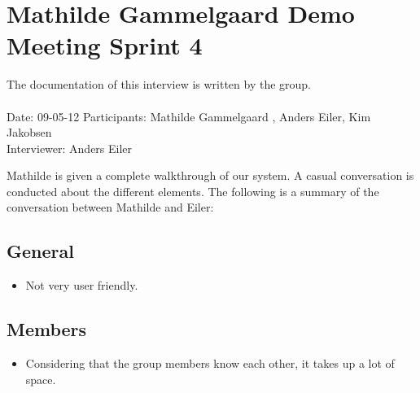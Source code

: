 \begin{comment}
\subsection*{Comments from the observers}
\begin{itemize}
	\item Meetings: It would be nice if it was possible to see what other activities that is arranged on a given date. This is relevant when creating a new meeting.(Henrik Koch)
	\item General: The name of the buttons are not consistent, some are labeled `` submit'' and others ``save''. (Kim Ahlstrøm)
	\item If the wall only contains a few elements, it displays the next page button even though only one page is available. (Kim Ahlstrøm)
	\item Lea was not able to edit group settings because she was not admin. It is a problem that admin rights are required to edit a group. (Kim Ahlstrøm)
	\item It would be nice with a small calender view in one of the sitebars (Anders Eiler)
\end{itemize}
\end{comment}


\section{Mathilde Gammelgaard Demo Meeting Sprint 4}
\label{app:mathildedemo}
The documentation of this interview is written by the \timelinegroup{} group. \\ \ \\
Date: 09-05-12
Participants: Mathilde Gammelgaard , Anders Eiler, Kim Jakobsen \\
Interviewer: Anders Eiler

Mathilde is given a complete walkthrough of our system.
A casual conversation is conducted about the different elements.
The following is a summary of the conversation between Mathilde and Eiler:

\subsection*{General}
\begin{itemize}
	\item Not very user friendly.
\end{itemize}


\subsection*{Members}
\begin{itemize}
	\item Considering that the group members know each other, it takes up a lot of space.
\end{itemize}


